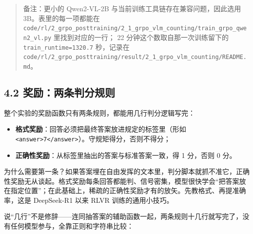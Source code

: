 \documentclass[
  chinese,
]{ctexart}
\providecommand{\tightlist}{%
  \setlength{\itemsep}{0pt}\setlength{\parskip}{0pt}}
\begin{document}
\begin{quote}
备注：更小的 Qwen2-VL-2B 与当前训练工具链存在兼容问题，因此选用
3B。表里的每一项都能在
\texttt{code/rl/2\_grpo\_posttraining/2\_1\_grpo\_vlm\_counting/train\_grpo\_qwen2\_vl.py}
里找到对应的一行； 22 分钟这个数取自那一次训练留下的
\texttt{train\_runtime=1320.7} 秒，记录在
\texttt{code/rl/2\_grpo\_posttraining/result/2\_1\_grpo\_vlm\_counting/README.md}。
\end{quote}

\subsection{4.2
奖励：两条判分规则}\label{ux5956ux52b1ux4e24ux6761ux5224ux5206ux89c4ux5219}

整个实验的奖励函数只有两条规则，都能用几行判分逻辑写完：

\begin{itemize}
\tightlist
\item
  \textbf{格式奖励}：回答必须把最终答案放进规定的标签里（形如
  \texttt{\textless{}answer\textgreater{}7\textless{}/answer\textgreater{}}）。守规矩得分，否则不得分；
\item
  \textbf{正确性奖励}：从标签里抽出的答案与标准答案一致，得 1 分，否则 0
  分。
\end{itemize}

为什么需要第一条？如果答案埋在自由发挥的文本里，判分脚本就抓不准它，正确性奖励无从谈起。格式奖励每条回答都能判、信号密集，模型很快学会``把答案放在指定位置''；在此基础上，稀疏的正确性奖励才有的放矢。先教格式、再提准确率，这是
DeepSeek-R1 以来 RLVR 训练的通用小技巧。

说``几行''不是修辞------连同抽答案的辅助函数一起，两条规则十几行就写完了，没有任何模型参与，全靠正则和字符串比较：
\end{document}
